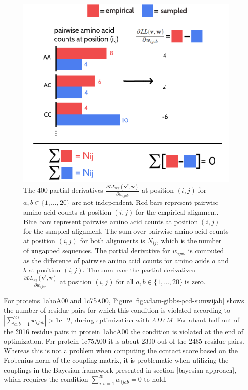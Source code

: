\documentclass[11pt,a4paper,twoside]{book}
\newcommand{\LLreg}{L\!L_\mathrm{reg}}
\renewcommand{\v}{\mathbf{v}}
\newcommand{\w}{\mathbf{w}}
\newcommand{\wijab}{w_{ijab}}
\theoremstyle{definition}
\theoremstyle{definition}
\theoremstyle{remark}
\begin{document}
\begin{figure}

{\centering \includegraphics[width=0.7\linewidth]{img/full_likelihood/constraint_wijab} 

}

\caption{The 400 partial derivatives
\(\frac{\partial \LLreg(\v^*,\w)}{\partial \wijab}\) at position
\((i,j)\) for \(a,b \in \{1, \ldots, 20 \}\) are not independent. Red
bars represent pairwise amino acid counts at position \((i,j)\) for the
empirical alignment. Blue bars represent pairwise amino acid counts at
position \((i,j)\) for the sampled alignment. The sum over pairwise
amino acid counts at position \((i,j)\) for both alignments is
\(N_{ij}\), which is the number of ungapped sequences. The partial
derivative for \(\wijab\) is computed as the difference of pairwise
amino acid counts for amino acids \(a\) and \(b\) at position \((i,j)\).
The sum over the partial derivatives
\(\frac{\partial \LLreg(\v^*,\w)}{\partial \wijab}\) at position
\((i,j)\) for all \(a,b \in \{1, \ldots, 20 \}\) is zero.}\label{fig:visualisation-wijab-constraint}
\end{figure}

For proteins 1ahoA00 and 1c75A00, Figure
\ref{fig:adam-gibbs-pcd-sumwijab} shows the number of residue pairs for
which this condition is violated according to
\(|\sum_{a,b=1}^{20} \wijab| > \mathrm{1e}{-2}\), during optimization
with \emph{ADAM}. For about half out of the 2016 residue pairs in
protein 1ahoA00 the condition is violated at the end of optimization.
For protein 1c75A00 it is about 2300 out of the 2485 residue pairs.
Whereas this is not a problem when computing the contact score based on
the Frobenius norm of the coupling matrix, it is problematic when
utilizing the couplings in the Bayesian framework presented in section
\ref{bayesian-approach}, which requires the condition
\(\sum_{a,b=1}^{20} \wijab = 0\) to hold.
\end{document}
